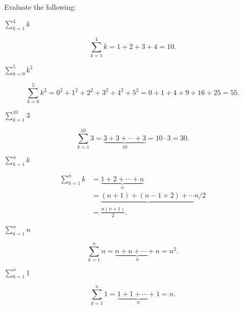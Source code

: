 \documentclass[../gatm_answers.tex]{subfiles}
\begin{document}
\begin{outer_problem}
\item Evaluate the following:
\end{outer_problem}

\begin{inner_problem}[start=1]
\item $\displaystyle\sum_{k=1}^4 k$
\end{inner_problem}

$$\displaystyle\sum_{k=1}^4 k = 1 + 2 + 3 + 4 = 10.$$

\begin{inner_problem}
\item $\displaystyle\sum_{k=0}^5 k^2$
\end{inner_problem}

$$\displaystyle\sum_{k=0}^5 k^2 = 0^2 + 1^2 + 2^2 + 3^2 + 4^2 + 5^2 = 0 + 1 + 4 + 9 + 16 + 25 = 55.$$

\begin{inner_problem}
\item $\displaystyle\sum_{k=1}^{10} 3$
\end{inner_problem}

$$\displaystyle\sum_{k=1}^{10} 3 = \underbrace{3 + 3 + \cdots + 3}_{10} = 10\cdot 3 = 30.$$

\begin{inner_problem}
\item $\displaystyle\sum_{k=1}^n k$
\end{inner_problem}

\begin{align*}
\sum_{k=1}^n k &= \underbrace{1 + 2 + \cdots + n}_{n} \\
&= \underbrace{(n+1) + (n-1+2) + \cdots}{n/2} \\
&= \frac{n(n+1)}{2}.
\end{align*}

\begin{inner_problem}
\item $\displaystyle\sum_{k=1}^n n$
\end{inner_problem}

$$\displaystyle\sum_{k=1}^n n = \underbrace{n + n + \cdots + n}_{n} = n^2.$$

\begin{inner_problem}
\item $\displaystyle\sum_{k=1}^n 1$
\end{inner_problem}

$$\displaystyle\sum_{k=1}^n 1 = \underbrace{1 + 1 + \cdots + 1}_{n} = n.$$
\end{document}
